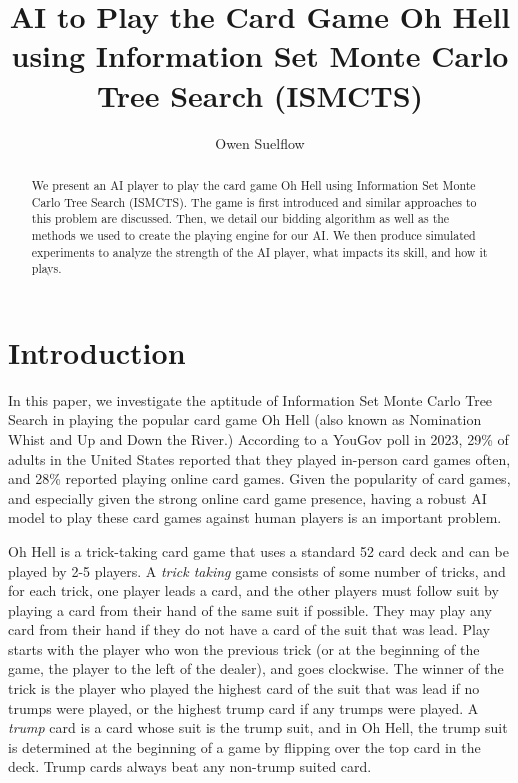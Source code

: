 \documentclass{article}
\title{AI to Play the Card Game Oh Hell using Information Set Monte Carlo Tree Search (ISMCTS)}
\author{Owen Suelflow}
\affil{Macalester College}
\date{}
\begin{document}
\maketitle

{\singlespacing
\begin{abstract}
    We present an AI player to play the card game Oh Hell using Information Set Monte Carlo Tree Search (ISMCTS).
    The game is first introduced and similar approaches to this problem are discussed. Then, we detail our bidding algorithm as well as the methods we used to create the playing engine for our AI. We then produce
    simulated experiments to analyze the strength of the AI player, what impacts its skill, and how it plays.
\end{abstract}}


\section{Introduction}
\label{section:Introduction}
In this paper, we investigate the aptitude of Information Set Monte Carlo Tree Search in playing the popular card game Oh Hell (also known as Nomination Whist and Up and Down the River.)
According to a YouGov poll in 2023, 29\% of adults in the United States reported that they played in-person card games often, and 28\% reported playing online card games. Given the popularity of card games, and
especially given the strong online card game presence, having a robust AI model to play these card games against human players is an important problem. 

Oh Hell is a trick-taking card game that uses a standard 52 card deck and can be played by 2-5 players.
A \textit{trick taking} game consists of some number of tricks, and for each trick, one player leads a card, and the other players must follow suit by playing a card from their hand of the same suit if possible.
They may play any card from their hand if they do not have a card of the suit that was lead. Play starts with the player who won the previous trick (or at the beginning of the game, the player to the left of the dealer), and goes clockwise. 
The winner of the trick is the player who played the highest card of the suit that was lead if no trumps were played, or the highest trump card if any trumps were played. 
A \textit{trump} card is a card whose suit is the trump suit, and in Oh Hell, the trump suit is determined at the beginning of a game by flipping over the top card in the deck.
Trump cards always beat any non-trump suited card.
\end{document}
